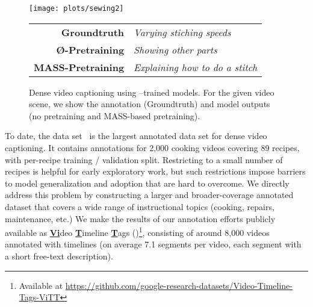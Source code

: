 \documentclass[11pt,a4paper]{article}
\begin{document}
\begin{figure}
\centering
\texttt{[image: plots/sewing2]}
{\small
\begin{tabular}{rl}
\textbf{Groundtruth} & \textit{Varying stiching speeds}\\    
\textbf{\O-Pretraining} & \textit{Showing other parts}   \\ 
\textbf{MASS-Pretraining} & \textit{Explaining how to do a stitch}   
\end{tabular}
}

\caption{Dense video captioning using \ldvm--trained models. For the given video scene, we show the \ldvm annotation (Groundtruth) and model outputs (no pretraining and MASS-based pretraining). }
\label{fig:my_label}
\end{figure} 
To date, the \youcook data set~\cite{zhou2018towards} is the largest annotated data set for dense video captioning.
It contains annotations for 2,000 cooking videos covering 89 recipes, with per-recipe training / validation split.
Restricting to a small number of recipes is helpful for early exploratory work, but such restrictions impose barriers to model generalization and adoption that are hard to overcome.
We directly address this problem by constructing a larger and broader-coverage annotated dataset that covers a wide range of instructional topics (cooking, repairs, maintenance, etc.)
We make the results of our annotation efforts publicly available as \underline{\textbf{Vi}}deo \underline{\textbf{T}}imeline \underline{\textbf{T}}ags ({\bf \ldvm})\footnote{Available at \url{https://github.com/google-research-datasets/Video-Timeline-Tags-ViTT}}, consisting of around 8,000 videos annotated with timelines (on average 7.1 segments per video, each segment with a short free-text description).
\end{document}
